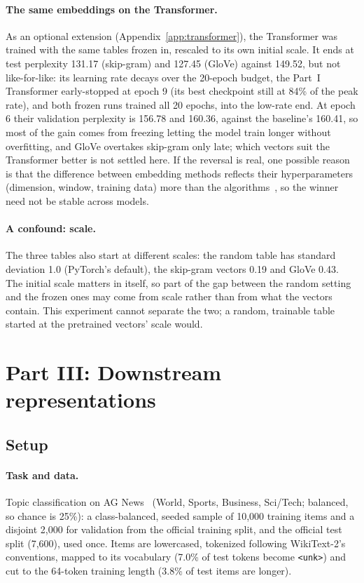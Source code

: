 \documentclass[10pt]{article}
\newcommand{\tok}[1]{\texttt{#1}}
\begin{document}
\paragraph{The same embeddings on the Transformer.} As an optional extension (Appendix~\ref{app:transformer}), the Transformer was trained with the same tables frozen in, rescaled to its own initial scale. It ends at test perplexity 131.17 (skip-gram) and 127.45 (GloVe) against 149.52, but not like-for-like: its learning rate decays over the 20-epoch budget, the Part~I Transformer early-stopped at epoch 9 (its best checkpoint still at 84\% of the peak rate), and both frozen runs trained all 20 epochs, into the low-rate end. At epoch 6 their validation perplexity is 156.78 and 160.36, against the baseline's 160.41, so most of the gain comes from freezing letting the model train longer without overfitting, and GloVe overtakes skip-gram only late; which vectors suit the Transformer better is not settled here. If the reversal is real, one possible reason is that the difference between embedding methods reflects their hyperparameters (dimension, window, training data) more than the algorithms~\cite{levy2015}, so the winner need not be stable across models.

\paragraph{A confound: scale.} The three tables also start at different scales: the random table has standard deviation 1.0 (PyTorch's default), the skip-gram vectors 0.19 and GloVe 0.43. The initial scale matters in itself, so part of the gap between the random setting and the frozen ones may come from scale rather than from what the vectors contain. This experiment cannot separate the two; a random, trainable table started at the pretrained vectors' scale would.

\section{Part III: Downstream representations}

\subsection{Setup}

\paragraph{Task and data.} Topic classification on AG News~\cite{zhang2015} (World, Sports, Business, Sci/Tech; balanced, so chance is 25\%): a class-balanced, seeded sample of 10,000 training items and a disjoint 2,000 for validation from the official training split, and the official test split (7,600), used once. Items are lowercased, tokenized following WikiText-2's conventions, mapped to its vocabulary (7.0\% of test tokens become \tok{<unk>}) and cut to the 64-token training length (3.8\% of test items are longer).
\end{document}
